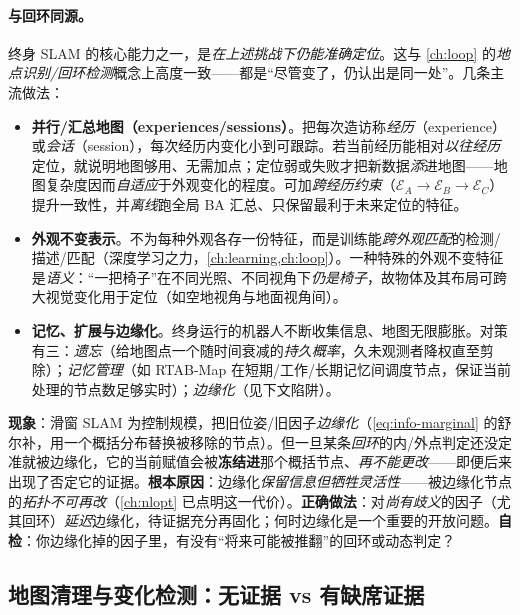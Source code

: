 \paragraph{与回环同源。}
终身 SLAM 的核心能力之一，是\emph{在上述挑战下仍能准确定位}。这与 \cref{ch:loop} 的\emph{地点识别/回环检测}概念上高度一致——都是“尽管变了，仍认出是同一处”。几条主流做法：
\begin{itemize}
  \item \textbf{并行/汇总地图（experiences/sessions）}。把每次造访称\emph{经历}（experience）或\emph{会话}（session），每次经历内变化小到可跟踪。若当前经历能相对\emph{以往经历}定位，就说明地图够用、无需加点；定位弱或失败才把新数据\emph{添}进地图——地图复杂度因而\emph{自适应}于外观变化的程度。可加\emph{跨经历约束}（$\mathcal{E}_A\!\to\!\mathcal{E}_B\!\to\!\mathcal{E}_C$）提升一致性，并\emph{离线}跑全局 BA 汇总、只保留最利于未来定位的特征。
  \item \textbf{外观不变表示}。不为每种外观各存一份特征，而是训练能\emph{跨外观匹配}的检测/描述/匹配（深度学习之力，\cref{ch:learning,ch:loop}）。一种特殊的外观不变特征是\emph{语义}：“一把椅子”在不同光照、不同视角下\emph{仍是椅子}，故物体及其布局可跨大视觉变化用于定位（如空地视角与地面视角间）。
  \item \textbf{记忆、扩展与边缘化}。终身运行的机器人不断收集信息、地图无限膨胀。对策有三：\emph{遗忘}（给地图点一个随时间衰减的\emph{持久概率}，久未观测者降权直至剪除）；\emph{记忆管理}（如 RTAB-Map 在短期/工作/长期记忆间调度节点，保证当前处理的节点数足够实时）；\emph{边缘化}（见下文陷阱）。
\end{itemize}

\begin{pitfall}
\textbf{现象}：滑窗 SLAM 为控制规模，把旧位姿/旧因子\emph{边缘化}（\cref{eq:info-marginal} 的舒尔补，用一个概括分布替换被移除的节点）。但一旦某条\emph{回环}的内/外点判定还没定准就被边缘化，它的当前赋值会被\textbf{冻结进}那个概括节点、\emph{再不能更改}——即便后来出现了否定它的证据。\textbf{根本原因}：边缘化\emph{保留信息但牺牲灵活性}——被边缘化节点的\emph{拓扑不可再改}（\cref{ch:nlopt} 已点明这一代价）。\textbf{正确做法}：对\emph{尚有歧义}的因子（尤其回环）\emph{延迟}边缘化，待证据充分再固化；何时边缘化是一个重要的开放问题。\textbf{自检}：你边缘化掉的因子里，有没有“将来可能被推翻”的回环或动态判定？
\end{pitfall}

\subsection{地图清理与变化检测：无证据 vs 有缺席证据}
\label{sec:dynamic-change-detect}

